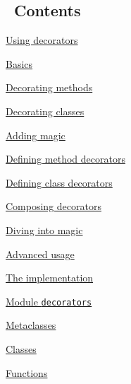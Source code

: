 \documentclass[11pt,english]{article}
\begin{document}
\hypertarget{contents}{}\subsection*{~\hfill Contents\hfill ~}
\begin{list}{}{}
\item \href{#using-decorators}{Using decorators}
\begin{list}{}{}
\item \href{#basics}{Basics}

\item \href{#decorating-methods}{Decorating methods}

\item \href{#decorating-classes}{Decorating classes}

\item \href{#adding-magic}{Adding magic}

\item \href{#defining-method-decorators}{Defining method decorators}

\item \href{#defining-class-decorators}{Defining class decorators}

\item \href{#composing-decorators}{Composing decorators}

\item \href{#diving-into-magic}{Diving into magic}

\item \href{#advanced-usage}{Advanced usage}

\end{list}

\item \href{#the-implementation}{The implementation}
\begin{list}{}{}
\item \href{#module-decorators}{Module \texttt{decorators}}
\begin{list}{}{}
\item \href{#id3}{Metaclasses}

\item \href{#classes}{Classes}

\item \href{#functions}{Functions}

\end{list}

\end{list}

\end{list}
\end{document}
